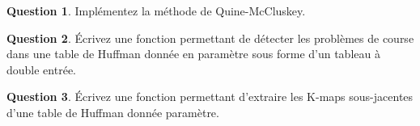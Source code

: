 \documentclass[11pt,a4paper,dvipsnames]{article}
\theoremstyle{definition}%
\newtheorem{Q}{Question}[] %
\begin{document}
\begin{Q}
Implémentez la méthode de Quine-McCluskey.
\end{Q}


\begin{Q}
Écrivez une fonction permettant de détecter les problèmes de course dans une table de Huffman donnée en paramètre sous forme d'un tableau à double entrée.
\end{Q}


\begin{Q}
Écrivez une fonction permettant d'extraire les K-maps sous-jacentes d'une table de Huffman donnée paramètre.
\end{Q}
\end{document}
